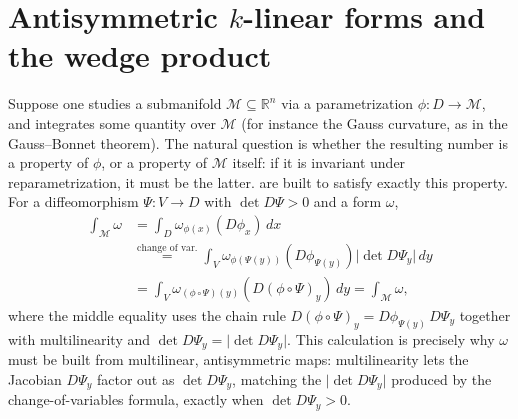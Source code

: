 
\section{Antisymmetric \texorpdfstring{$k$}{k}-linear forms and the wedge product}
\label{sec:antisymmetric_forms}

\begin{ainote}[Motivation]
Suppose one studies a submanifold $\mathcal{M} \subseteq \mathbb{R}^n$ via a parametrization
$\phi : D \to \mathcal{M}$, and integrates some quantity over $\mathcal{M}$ (for instance the
Gauss curvature, as in the Gauss--Bonnet theorem). The natural question is whether the
resulting number is a property of $\phi$, or a property of $\mathcal{M}$ itself: if it is
invariant under reparametrization, it must be the latter.  are
built to satisfy exactly this property. For a diffeomorphism $\Psi : V \to D$ with
$\det D\Psi > 0$ and a form $\omega$,
\begin{align}
\int_{\mathcal{M}} \omega &= \int_D \omega_{\phi(x)}(D\phi_x)\,dx \nonumber \\
  &\overset{\text{change of var.}}{=} \int_V \omega_{\phi(\Psi(y))}(D\phi_{\Psi(y)})
  \lvert\det D\Psi_y\rvert\,dy \nonumber \\
  &= \int_V \omega_{(\phi\circ\Psi)(y)}(D(\phi\circ\Psi)_y)\,dy = \int_{\mathcal{M}} \omega,
  \nonumber
\end{align}
where the middle equality uses the chain rule $D(\phi\circ\Psi)_y = D\phi_{\Psi(y)}\,D\Psi_y$
together with multilinearity and $\det D\Psi_y = \lvert\det D\Psi_y\rvert$. This calculation
is precisely why $\omega$ must be built from multilinear, antisymmetric maps: multilinearity
lets the Jacobian $D\Psi_y$ factor out as $\det D\Psi_y$, matching the $\lvert\det
D\Psi_y\rvert$ produced by the change-of-variables formula, exactly when $\det D\Psi_y > 0$.
\end{ainote}

